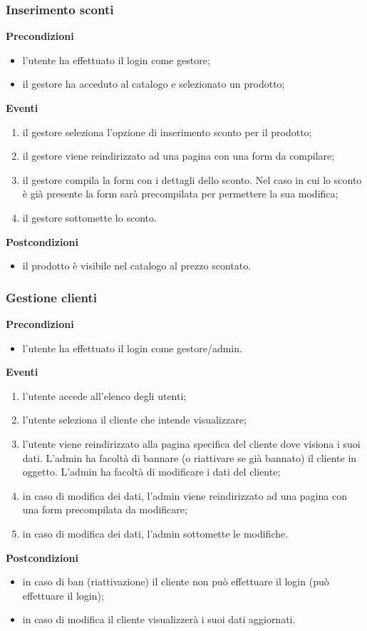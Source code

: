 \documentclass[a4paper, 14pt]{article}
\begin{document}
\begin{flushleft}
			\bigskip
			\subsubsection{Inserimento sconti}
			\textbf{Precondizioni}
			\begin{itemize}
				\item l'utente ha effettuato il login come gestore;
				\item il gestore ha acceduto al catalogo e selezionato un prodotto;
			\end{itemize}
			\textbf{Eventi}
			\begin{enumerate}
				\item il gestore seleziona l'opzione di inserimento sconto per il prodotto;
				\item il gestore viene reindirizzato ad una pagina con una form da compilare;
				\item il gestore compila la form con i dettagli dello sconto. Nel caso in cui lo sconto è già presente la form sarà precompilata 
					  per permettere la sua modifica;
				\item il gestore sottomette lo sconto.
			\end{enumerate}
			\textbf{Postcondizioni}
			\begin{itemize}
				\item il prodotto è visibile nel catalogo al prezzo scontato.
			\end{itemize}
		
			\bigskip
			\subsubsection{Gestione clienti}
			\textbf{Precondizioni}
			\begin{itemize}
				\item l'utente ha effettuato il login come gestore/admin.
			\end{itemize}
			\textbf{Eventi}
			\begin{enumerate}
				\item l'utente accede all'elenco degli utenti;
				\item l'utente seleziona il cliente che intende visualizzare;
				\item l'utente viene reindirizzato alla pagina specifica del cliente dove visiona i suoi dati.
					  L'admin ha facoltà di bannare (o riattivare se già bannato) il cliente in oggetto.
					  L'admin ha facoltà di modificare i dati del cliente;
				\item in caso di modifica dei dati, l'admin viene reindirizzato ad una pagina con una form precompilata
					  da modificare;
				\item in caso di modifica dei dati, l'admin sottomette le modifiche.
			\end{enumerate}
			\textbf{Postcondizioni}
			\begin{itemize}
				\item in caso di ban (riattivazione) il cliente non può effettuare il login (può effettuare il login);
				\item in caso di modifica il cliente visualizzerà i suoi dati aggiornati.
			\end{itemize}
			

\end{flushleft}
\end{document}
